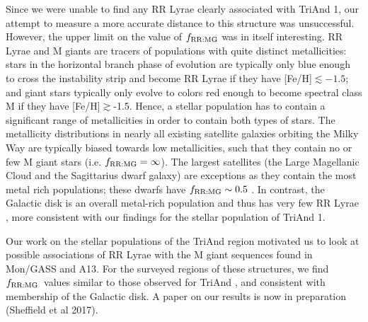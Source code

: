 \documentclass[galaxies,article,submit,moreauthors,pdftex,10pt,a4paper]{mdpi}
\newcommand{\frrmg}{\ensuremath{f_{\rm RR:MG}}}
\begin{document}

Since we were unable to find any RR Lyrae clearly associated with TriAnd 1, our attempt to measure a more accurate distance to this structure was unsuccessful.
However, the upper limit on the value of $\frrmg$ was in itself interesting.
RR Lyrae and M giants are tracers of populations with quite distinct metallicities: stars in the horizontal branch phase of evolution are typically only blue enough to cross the instability strip and become RR Lyrae if they have [Fe/H]$\lesssim -1.5$; and giant stars typically only evolve to colors red enough to become spectral class M if they have [Fe/H]$\gtrsim$-1.5.
Hence, a stellar population has to contain a significant range of metallicities in order to contain both types of stars.
The metallicity distributions in nearly all existing satellite galaxies
orbiting the Milky Way \cite[e.g.,][]{kirby11} are typically biased towards
low metallicities, such that they contain no or few M giant stars (i.e. $\frrmg = \infty$).
The largest satellites (the Large Magellanic Cloud and the Sagittarius dwarf galaxy) are exceptions as they contain the most metal rich populations; these dwarfs have $\frrmg \sim 0.5$ \cite{pricewhelan15}.
In contrast, the Galactic disk is an overall metal-rich population and thus has very few RR Lyrae \cite[i.e. $\frrmg \sim 0$][]{amrose01}, more consistent with our findings for the stellar population of TriAnd 1.

Our work on the stellar populations of the TriAnd region motivated us to look at possible associations of RR Lyrae with the M giant sequences found in Mon/GASS and A13.
For the surveyed regions of these structures, we find \frrmg\ values similar to those observed for TriAnd , and consistent with membership of the Galactic disk. A paper on our results is now in preparation (Sheffield et al 2017).
\end{document}
